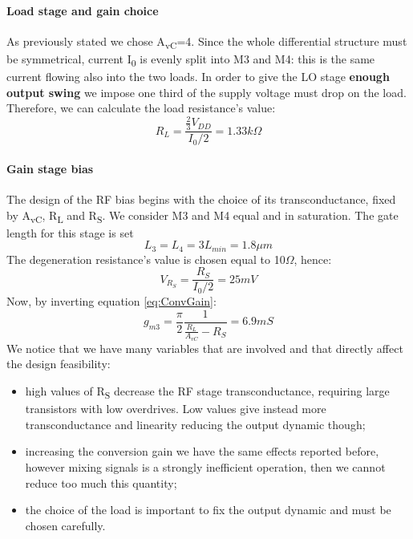 \paragraph{Load stage and gain choice}
As previously stated we chose A\textsubscript{vC}=4. 
Since the whole differential structure must be symmetrical, current I\textsubscript{0} is evenly split into M3 and M4: this is the same current flowing also into the two loads. In order to give the LO stage \textbf{enough output swing} we impose one third of the supply voltage must drop on the load. Therefore, we can calculate the load resistance's value:
\begin{equation}
R_L = \frac{\frac{2}{3}V_{DD}}{I_0/2} = 1.33 k\Omega
\end{equation}

\paragraph{Gain stage bias}
The design of the RF bias begins with the choice of its transconductance, fixed by A\textsubscript{vC}, R\textsubscript{L} and R\textsubscript{S}. We consider M3 and M4 equal and in saturation. The gate length for this stage is set
\begin{equation}
	L_3 = L_4 = 3 L_{min} = 1.8 \mu m
\end{equation} 
The  degeneration resistance's value is chosen equal to 10$\Omega$, hence:
\begin{equation}
V_{R_S}=\frac{R_S}{I_0/2} = 25 mV
\end{equation}
Now, by inverting equation \ref{eq:ConvGain}:
\begin{equation}
	g_{m3} = \frac{\pi}{2}\frac{1}{\frac{R_L}{A_{vC}}-R_S}=6.9 mS
\end{equation}
We notice that we have many variables that are involved and that directly affect the design feasibility:
\begin{itemize}
	\item high values of R\textsubscript{S} decrease the RF stage transconductance, requiring large transistors with low overdrives. Low values give instead more transconductance and linearity reducing the output dynamic though;
	\item increasing the conversion gain we have the same effects reported before, however mixing signals is a strongly inefficient operation, then we cannot reduce too much this quantity;
	\item the choice of the load is important to fix the output dynamic and must be chosen carefully.
\end{itemize}
